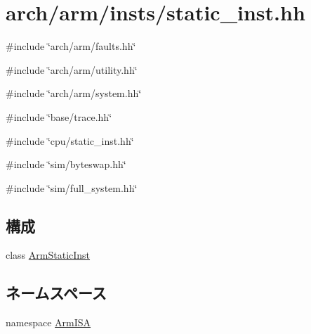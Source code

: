 \hypertarget{arch_2arm_2insts_2static__inst_8hh}{
\section{arch/arm/insts/static\_\-inst.hh}
\label{arch_2arm_2insts_2static__inst_8hh}
}
{\ttfamily \#include \char`\"{}arch/arm/faults.hh\char`\"{}}\par
{\ttfamily \#include \char`\"{}arch/arm/utility.hh\char`\"{}}\par
{\ttfamily \#include \char`\"{}arch/arm/system.hh\char`\"{}}\par
{\ttfamily \#include \char`\"{}base/trace.hh\char`\"{}}\par
{\ttfamily \#include \char`\"{}cpu/static\_\-inst.hh\char`\"{}}\par
{\ttfamily \#include \char`\"{}sim/byteswap.hh\char`\"{}}\par
{\ttfamily \#include \char`\"{}sim/full\_\-system.hh\char`\"{}}\par
\subsection*{構成}
\begin{DoxyCompactItemize}
\item 
class \hyperlink{classArmISA_1_1ArmStaticInst}{ArmStaticInst}
\end{DoxyCompactItemize}
\subsection*{ネームスペース}
\begin{DoxyCompactItemize}
\item 
namespace \hyperlink{namespaceArmISA}{ArmISA}
\end{DoxyCompactItemize}
